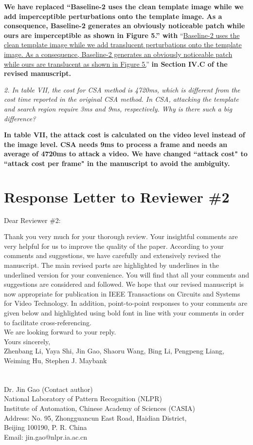 \documentclass[12pt]{article}
\begin{document}
\textbf{We have replaced ``Baseline-2 uses the clean template image while we add imperceptible perturbations onto the template image. As a consequence, Baseline-2 generates an obviously noticeable patch while ours are imperceptible as shown in Figure 5.'' with} 
``\uline{Baseline-2 uses the clean template image while we add translucent perturbations onto the template image. As a consequence, Baseline-2 generates an obviously noticeable patch while ours are translucent as shown in Figure 5.}'' 
\textbf{in Section IV.C of the revised manuscript.}

\textit{2. In table VII, the cost for CSA method is 4720ms, which is different from the cost time reported in the original CSA method. In CSA, attacking the template and search region require 3ms and 9ms, respectively. Why is there such a big difference?}

\textbf{In table VII, the attack cost is calculated on the video level instead of the image level. CSA needs 9ms to process a frame and needs an average of 4720ms to attack a video. We have changed ``attack cost" to ``attack cost per frame" in the manuscript to avoid the ambiguity.}

\newpage
{\centering\section*{Response Letter to Reviewer \#2}}
\noindent Dear Reviewer \#2:

Thank you very much for your thorough review. Your insightful comments are very helpful for us to improve the quality of the paper. According to your comments and suggestions, we have carefully and extensively revised the manuscript. The main revised parts are highlighted by underlines in the underlined version for your convenience. You will find that all your comments and suggestions are considered and followed. We hope that our revised manuscript is now appropriate for publication in IEEE Transactions on Circuits and Systems for Video Technology.
In addition, point-to-point responses to your comments are given below and highlighted using bold font in line with your comments in order to facilitate cross-referencing.\\[10pt]
\indent We are looking forward to your reply.\\[10pt]
\noindent Yours sincerely,\\
\noindent Zhenbang Li, Yaya Shi, Jin Gao, Shaoru Wang, Bing Li, Pengpeng Liang, Weiming Hu, Stephen J. Maybank
\\
\\
\\
\noindent Dr. Jin Gao (Contact author)\\
\noindent National Laboratory of Pattern Recognition (NLPR)\\
\noindent Institute of Automation, Chinese Academy of Sciences (CASIA)\\
\noindent Address: No. 95, Zhongguancun East Road, Haidian District,\\
\noindent Beijing 100190, P. R. China\\
\noindent Email: jin.gao@nlpr.ia.ac.cn
\end{document}
